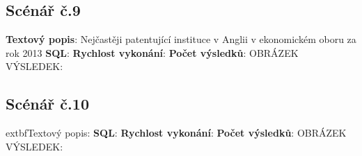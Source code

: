 \subsection{Scénář č.9}
\textbf{Textový popis}: Nejčastěji patentující instituce v Anglii v ekonomickém oboru za rok 2013
\newline
\textbf{SQL}: 
\newline
\textbf{Rychlost vykonání}: 
\newline
\textbf{Počet výsledků}:
\newline
OBRÁZEK VÝSLEDEK:

\subsection{Scénář č.10}
extbf{Textový popis}: 
\newline
\textbf{SQL}: 
\newline
\textbf{Rychlost vykonání}: 
\newline
\textbf{Počet výsledků}:
\newline
OBRÁZEK VÝSLEDEK: